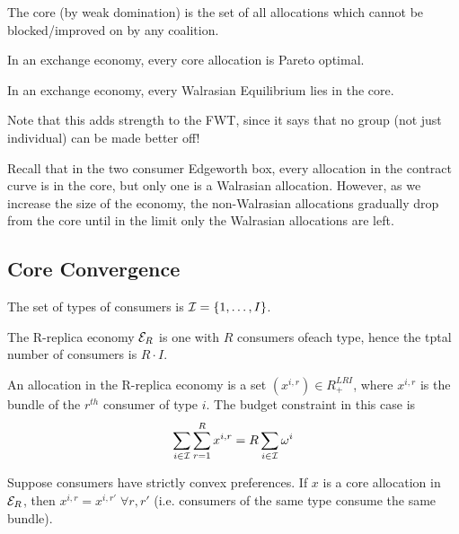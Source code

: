 \begin{definition}[Core]
  The core (by weak domination) is the set of all allocations which
  cannot be blocked/improved on by any coalition.
\end{definition}

\begin{prop}
  In an exchange economy, every core allocation is Pareto optimal.
\end{prop}

\begin{prop}
  In an exchange economy, every Walrasian Equilibrium lies in the
  core.
\end{prop}

Note that this adds strength to the FWT, since it says that no group
(not just individual) can be made better off!

Recall that in the two consumer Edgeworth box, every allocation in the
contract curve is in the core, but only one is a Walrasian
allocation. However, as we increase the size of the economy, the
non-Walrasian allocations gradually drop from the core until in the
limit only the Walrasian allocations are left.

\subsection{Core Convergence}
\label{sec:core-convergence}

\begin{definition}[Type]
  The set of types of consumers is ${\cal I} = \{1, \dots, I\}$.
\end{definition}

\begin{definition}
  The R-replica economy ${\cal E}_R$ is one with $R$ consumers ofeach
  type, hence the tptal number of consumers is $R \cdot I$.
\end{definition}

\begin{definition}[Allocation]
  An allocation in the R-replica economy is a set $(x^{i,r}) \in
  R^{LRI}_+$, where $x^{i,r}$ is the bundle of the $r^{th}$ consumer
  of type $i$. The budget constraint in this case is
  \[
  \sum_{i \in {\cal I}} \sum_{r=1}^R x^{i,r} = R \sum_{i \in {\cal I}} \omega^i
  \]
\end{definition}


\begin{prop}
  Suppose consumers have strictly convex preferences. If $x$ is a core
  allocation in ${\cal E}_R$, then $x^{i,r} = x^{i,r'} \; \forall r,
  r'$ (i.e. consumers of the same type consume the same bundle).
\end{prop}

